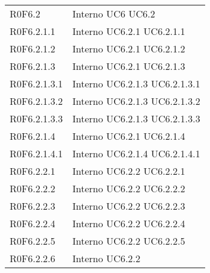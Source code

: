 \begin{longtable}{p{2.5cm}!{\VRule[1pt]}p{2.5cm}}
R0F6.2 & Interno \newline UC6
 \newline UC6.2
 \\
R0F6.2.1.1 & Interno \newline UC6.2.1
 \newline UC6.2.1.1
 \\
R0F6.2.1.2 & Interno \newline UC6.2.1
 \newline UC6.2.1.2
 \\
R0F6.2.1.3 & Interno \newline UC6.2.1
 \newline UC6.2.1.3
 \\
R0F6.2.1.3.1 & Interno \newline UC6.2.1.3
 \newline UC6.2.1.3.1
 \\
R0F6.2.1.3.2 & Interno \newline UC6.2.1.3
 \newline UC6.2.1.3.2
 \\
R0F6.2.1.3.3 & Interno \newline UC6.2.1.3
 \newline UC6.2.1.3.3
 \\
R0F6.2.1.4 & Interno \newline UC6.2.1
 \newline UC6.2.1.4
 \\
R0F6.2.1.4.1 & Interno \newline UC6.2.1.4
 \newline UC6.2.1.4.1
 \\
R0F6.2.2.1 & Interno \newline UC6.2.2
 \newline UC6.2.2.1
 \\
R0F6.2.2.2 & Interno \newline UC6.2.2
 \newline UC6.2.2.2
 \\
R0F6.2.2.3 & Interno \newline UC6.2.2
 \newline UC6.2.2.3
 \\
R0F6.2.2.4 & Interno \newline UC6.2.2
 \newline UC6.2.2.4
 \\
R0F6.2.2.5 & Interno \newline UC6.2.2
 \newline UC6.2.2.5
 \\
R0F6.2.2.6 & Interno \newline UC6.2.2

\end{longtable}
